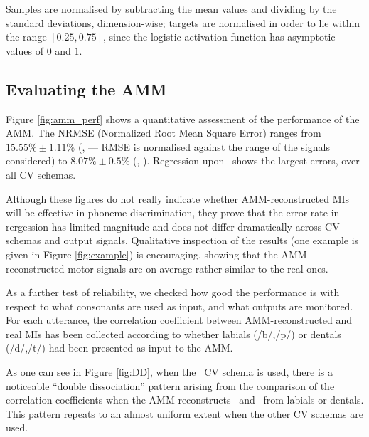 Samples are normalised by subtracting the mean values
and dividing by the standard deviations, dimension-wise; targets are
normalised in order to lie within the range $[0.25,0.75]$, since the
logistic activation function has asymptotic values of $0$ and $1$.

\subsection{Evaluating the AMM}
\label{subsec:amm_results}

Figure \ref{fig:amm_perf} shows a quantitative assessment of the performance
of the AMM. The NRMSE (Normalized Root Mean Square Error) ranges from $15.55\% \pm 1.11\%$ (\vlio, \coa ---
RMSE is normalised against the range of the signals considered) to
$8.07\% \pm 0.5\%$ (\vttu, \spkc). Regression upon \vlio\ shows the largest
errors, over all CV schemas.

Although these figures do not really indicate whether AMM-reconstructed MIs will be
effective in phoneme discrimination, they prove that the error rate in rergession has
limited magnitude and does not differ dramatically across CV schemas and output signals.
Qualitative inspection of the results (one example is given in Figure \ref{fig:example})
is encouraging, showing that the AMM-reconstructed motor signals are on average rather
similar to the real ones.

As a further test of reliability, we checked how good the performance is with respect
to what consonants are used as input, and what outputs are monitored. For each utterance,
the correlation coefficient between AMM-reconstructed and real MIs has been collected
according to whether labials (/b/,/p/) or dentals (/d/,/t/) had been presented as input
to the AMM.

As one can see in Figure \ref{fig:DD}, when the \overall\ CV schema is used,
there is a noticeable ``double dissociation''
pattern arising from the comparison of the correlation coefficients when the AMM
reconstructs \vlio\ and \vttu\ from labials or dentals. This pattern repeats to an
almost uniform extent when the other CV schemas are used.

%
